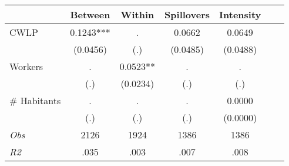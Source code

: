 \begin{tabular}{l*{6}{c}}\hline&\multicolumn{1}{c}{Between}&\multicolumn{1}{c}{Within}&\multicolumn{1}{c}{Spillovers}&\multicolumn{1}{c}{Intensity}\\ \hline 
CWLP & 0.1243*** & . & 0.0662 & 0.0649 \\
 & (0.0456) & (.) & (0.0485) & (0.0488) \\
Workers & . & 0.0523** & . & . \\
 & (.) & (0.0234) & (.) & (.) \\
\# Habitants & . & . & . & 0.0000 \\
  & (.) & (.) & (.) & (0.0000) \\
\hline \textit{Obs} & 2126 & 1924 & 1386 & 1386  \\ \textit{R2} & .035 & .003 & .007 & .008 \\ \hline \end{tabular}

